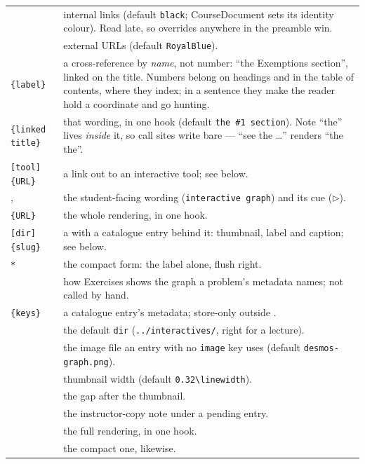 \begin{center}
\begin{tabularx}{\linewidth}{@{}l Y@{}}
 & internal links (default \texttt{black}; CourseDocument
  sets its identity colour). Read late, so overrides anywhere in the
  preamble win.\\
 & external URLs (default \texttt{RoyalBlue}).\\
\texttt{\{label\}} & a cross-reference by \emph{name}, not
  number: ``the Exemptions section'', linked on the title. Numbers belong
  on headings and in the table of contents, where they index; in a
  sentence they make the reader hold a coordinate and go hunting.\\
\texttt{\{linked title\}} & that wording, in one hook
  (default \texttt{the \#1 section}). Note ``the'' lives \emph{inside} it,
  so call sites write  bare --- ``see the \ldots''
  renders ``the the''.\\
\texttt{[tool]\{URL\}} & a link out to an interactive tool; see
  below.\\
,  & the student-facing wording
  (\texttt{interactive graph}) and its cue ($\triangleright$).\\
\texttt{\{URL\}} & the whole rendering, in one hook.\\
\texttt{[dir]\{slug\}} & a  with a catalogue
  entry behind it: thumbnail, label and caption; see below.\\
\texttt{*} & the compact form: the label alone, flush
  right.\\
 & how Exercises shows the graph a problem's
  metadata names; not called by hand.\\
\texttt{\{keys\}} & a catalogue entry's metadata;
  store-only outside .\\
 & the default \texttt{dir}
  (\texttt{../interactives/}, right for a lecture).\\
 & the image file an entry with no \texttt{image}
  key uses (default \texttt{desmos-graph.png}).\\
 & thumbnail width
  (default \texttt{0.32\textbackslash linewidth}).\\
 & the gap after the thumbnail.\\
 & the instructor-copy note under a pending
  entry.\\
 & the full rendering, in one hook.\\
 & the compact one, likewise.\\
\end{tabularx}
\end{center}


